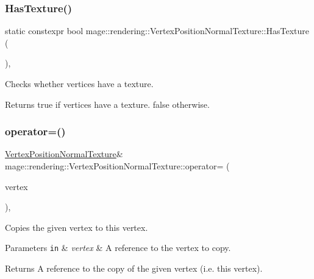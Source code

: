 \subsubsection{\texorpdfstring{Has\+Texture()}{HasTexture()}}
{\footnotesize\ttfamily static constexpr bool mage\+::rendering\+::\+Vertex\+Position\+Normal\+Texture\+::\+Has\+Texture (\begin{DoxyParamCaption}{ }\end{DoxyParamCaption})\hspace{0.3cm}{\ttfamily [static]}, {\ttfamily [noexcept]}}

Checks whether vertices have a texture.

\begin{DoxyReturn}{Returns}
{\ttfamily true} if vertices have a texture. {\ttfamily false} otherwise. 
\end{DoxyReturn}
\mbox{\label{structmage_1_1rendering_1_1_vertex_position_normal_texture_a482076430e7cfa9f1cba373aaa3d1bb4}} 
\subsubsection{\texorpdfstring{operator=()}{operator=()}\hspace{0.1cm}{\footnotesize\ttfamily [1/2]}}
{\footnotesize\ttfamily \mbox{\hyperlink{structmage_1_1rendering_1_1_vertex_position_normal_texture}{Vertex\+Position\+Normal\+Texture}}\& mage\+::rendering\+::\+Vertex\+Position\+Normal\+Texture\+::operator= (\begin{DoxyParamCaption}\item[{const \mbox{\hyperlink{structmage_1_1rendering_1_1_vertex_position_normal_texture}{Vertex\+Position\+Normal\+Texture}} \&}]{vertex }\end{DoxyParamCaption})\hspace{0.3cm}{\ttfamily [default]}, {\ttfamily [noexcept]}}

Copies the given vertex to this vertex.


\begin{DoxyParams}[1]{Parameters}
\mbox{\tt in}  & {\em vertex} & A reference to the vertex to copy. \\
\hline
\end{DoxyParams}
\begin{DoxyReturn}{Returns}
A reference to the copy of the given vertex (i.\+e. this vertex). 
\end{DoxyReturn}
\mbox{\label{structmage_1_1rendering_1_1_vertex_position_normal_texture_a54a6a783cc62f078d58c30b2d5922994}} 
